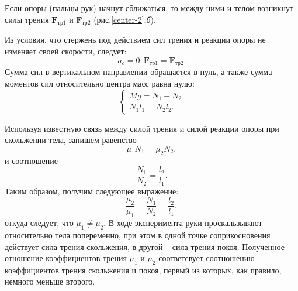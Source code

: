 \documentclass[All.tex]{subfiles}
\begin{document}
		Если опоры (пальцы рук) начнут сближаться, то между ними и телом возникнут силы трения $ \textbf{F}_{\text{тр}1} $ и $ \textbf{F}_{\text{тр}2} $ (рис.\ref{center-2},\textit{б}).
				
		Из условия, что стержень под действием сил трения и реакции опоры не изменяет своей скорости, следует:
		\begin{equation}
		a_c=0: \textbf{F}_{\text{тр}1} =\textbf{F}_{\text{тр}2}.
		\end{equation}	
		Сумма сил в вертикальном направлении обращается в нуль, а также сумма моментов сил относительно центра масс равна нулю:
		\begin{equation}
		\begin{cases}
		Mg = N_1 + N_2 \\
		N_1l_1 = N_2l_2.
		\end{cases}
		\end{equation}

Используя известную связь между силой трения и силой реакции опоры при скольжении тела, запишем равенство
\begin{equation}
\mu_1N_1 =\mu_2N_2,
\end{equation}
и соотношение
\begin{equation}
\dfrac{N_1}{N_2} =\dfrac{l_2}{l_1}.
\end{equation}
Таким образом, получим следующее выражение:
\begin{equation}
\dfrac{\mu_2}{\mu_1}=\dfrac{N_1}{N_2} =\dfrac{l_2}{l_1},
\end{equation}
откуда следует, что $ \mu_1 \neq \mu_2 $. В ходе эксперимента руки проскальзывают относительно тела попеременно, при этом в одной точке соприкосновения действует сила трения скольжения, в другой -- сила трения покоя. Полученное отношение коэффициентов трения $ \mu_1 $ и $ \mu_2 $ соответсвует соотношению коэффициентов трения скольжения и покоя, первый из которых, как правило, немного меньше второго.
\end{document}
